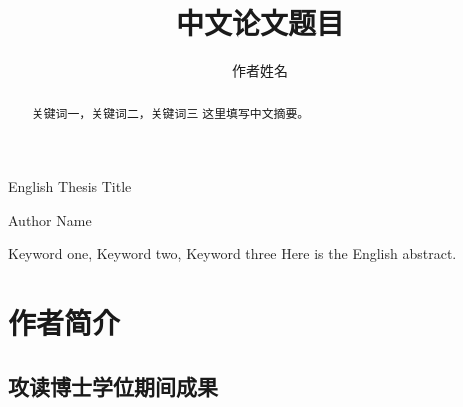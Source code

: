 \documentclass[nomlist,phd,AutoFakeBold]{seuthesix}
\begin{document}
\categorynumber{*}
\UDC{*}
\title{中文论文题目}{}{English Thesis Title}{}
\author{作者姓名}{Author Name}
\submajor{}
\authorizedate{}

\makebigcover
\makecover

\begin{abstract}{关键词一，关键词二，关键词三}
这里填写中文摘要。
\end{abstract}

\begin{englishabstract}{Keyword one, Keyword two, Keyword three}
Here is the English abstract.
\end{englishabstract}

\tableofcontents

\listofothers

\mainmatter








\appendix


\chapter{作者简介}
\section*{攻读博士学位期间成果}
\end{document}
